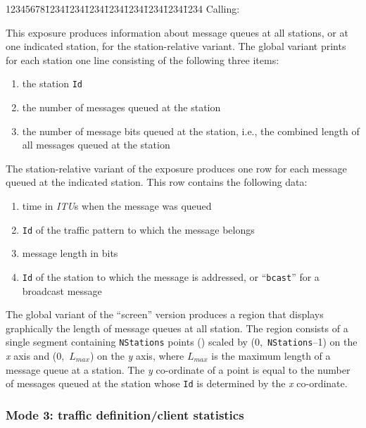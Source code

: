 {\tt\begin{tabbing}
12345678\=1234\=1234\=1234\=1234\=1234\=1234\=1234\=1234\kill
{\rm Calling:}
\end{tabbing}}

This exposure produces information about message queues at all stations, or
at one indicated station, for the station-relative variant.
The global variant prints for each station one line consisting of the
following three items:

\begin{enumerate}
\item
the station {\tt Id}
\item
the number of messages queued at the station
\item
the number of message bits queued at the station, i.e., the combined
length of all messages queued at the station
\end{enumerate}

The station-relative variant of the exposure produces one row for each
message queued at the indicated station.
This row contains the following data:

\begin{enumerate}
\item
time in {\em ITU\/}s when the message was queued
\item
{\tt Id} of the traffic pattern to which the message belongs
\item
message length in bits
\item
{\tt Id} of the station to which the message is addressed, or
``{\tt bcast}'' for a broadcast message
\end{enumerate}

The global variant of the ``screen'' version produces a region that displays
graphically the length of message queues at all station.
The region consists of a single segment containing {\tt NStations} points
() scaled by (0,~{\tt NStations}--1) on the {\em x\/} axis
and
(0,~$L_{max}$)
on the {\em y\/} axis, where
$L_{max}$
is the maximum length of a message queue at a station.
The {\em y\/} co-ordinate of a point is equal to the number of messages queued
at the station whose {\tt Id} is determined by the {\em x\/} co-ordinate.

\subsubsection*{Mode 3: traffic definition/client statistics}

